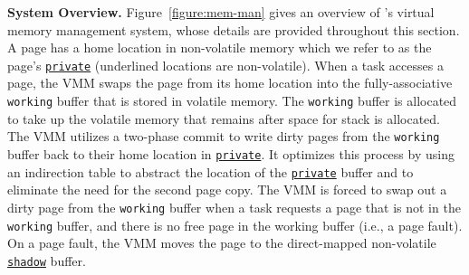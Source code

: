 %
\textbf{System Overview.}
Figure~\ref{figure:mem-man} gives an overview of \sys's virtual memory management system,
whose details are provided throughout this section.
A page has a home location in non-volatile memory which we refer to as the page's
\texttt{\underline{private}} (underlined locations are non-volatile).  When a
task accesses a page, the VMM swaps the page from its home location
into the fully\hyp{}associative \texttt{working} buffer that is stored in
volatile memory.  The \texttt{working} buffer is allocated to take up the
volatile memory that remains after space for stack is allocated.
%
The VMM utilizes a two-phase commit to write dirty pages from the \texttt{working}
buffer back to their home location in \texttt{\underline{private}}. It optimizes this process by using an indirection table to abstract the location of the \texttt{\underline{private}} buffer and
to eliminate the need for the second page copy.
%
The VMM is forced to swap out a dirty page from the \texttt{working} buffer
when a task requests a page that is not in the \texttt{working} buffer, and there is no
free page in the working buffer (i.e., a page fault). On a page fault, the VMM
moves the page to the direct\hyp{}mapped non-volatile \texttt{\underline{shadow}} buffer. \\
%

